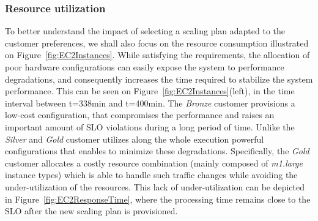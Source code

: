 \subsubsection{Resource utilization} 
To better understand the impact of selecting a scaling plan adapted to the customer preferences, we shall also focus on the resource consumption illustrated on Figure~\ref{fig:EC2Instances}. While satisfying the requirements, the allocation of poor hardware configurations can easily expose the system to performance degradations, and consequently increases the time required to stabilize the system performance. This can be seen on  Figure~\ref{fig:EC2Instances}(left), in the time interval between t=338min and t=400min. The \emph{Bronze} customer provisions a low-cost configuration, that compromises the performance and raises an important amount of SLO violations during a long period of time. Unlike the \emph{Silver} and \emph{Gold} customer utilizes along the whole execution powerful configurations that enables to minimize these degradations. Specifically, the \emph{Gold} customer allocates a costly resource combination (mainly composed of \emph{m1.large} instance types) which is able to handle such traffic changes while avoiding the under-utilization of the resources. This lack of under-utilization can be depicted in Figure~\ref{fig:EC2ResponseTime}, where the processing time remains close to the SLO after the new scaling plan is provisioned.


\setcounter{figure}{7}

